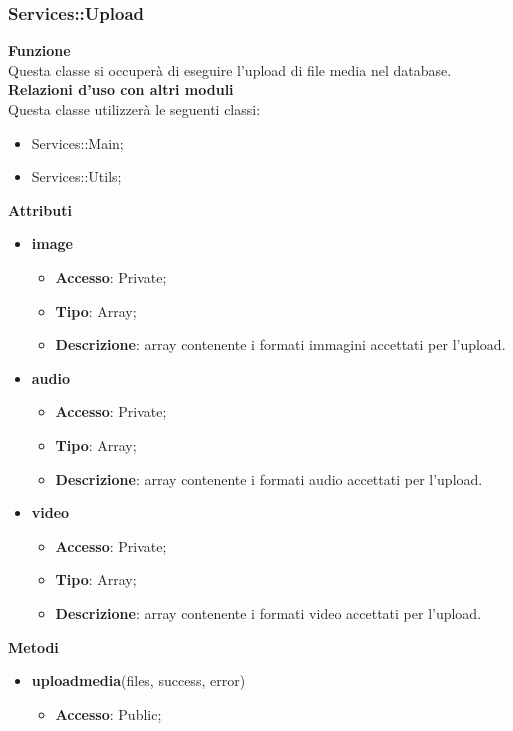 \subsubsection{Services::Upload}{
		\label{sub:servicesUpload}
		\textbf{Funzione}\\
		\indent Questa classe si occuperà di eseguire l'upload di file media nel database.\\
		\textbf{Relazioni d'uso con altri moduli}\\
		\indent Questa classe utilizzerà le seguenti classi:
		\begin{itemize}
			\item Services::Main;
			\item Services::Utils;
		\end{itemize}
		\textbf{Attributi}
		\begin{itemize}
			\item \textbf{image}
			\begin{itemize}
				\item \textbf{Accesso}: Private;
				\item \textbf{Tipo}: Array;
				\item \textbf{Descrizione}: array contenente i formati immagini accettati per l'upload.
			\end{itemize}
			\item \textbf{audio}
			\begin{itemize}
				\item \textbf{Accesso}: Private;
				\item \textbf{Tipo}: Array;
				\item \textbf{Descrizione}: array contenente i formati audio accettati per l'upload.
			\end{itemize}
			\item \textbf{video}
			\begin{itemize}
				\item \textbf{Accesso}: Private;
				\item \textbf{Tipo}: Array;
				\item \textbf{Descrizione}: array contenente i formati video accettati per l'upload.
			\end{itemize}
		\end{itemize}
		\textbf{Metodi}
		\begin{itemize}
			\item \textbf{uploadmedia}(files, success, error)
			\begin{itemize}
				\item \textbf{Accesso}: Public;

\end{itemize}
\end{itemize}}

